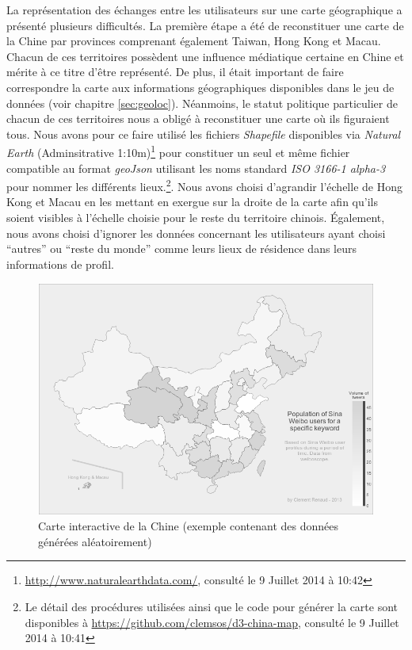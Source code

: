     La représentation des échanges entre les utilisateurs sur une carte géographique a présenté plusieurs difficultés. La première étape a été de reconstituer une carte de la Chine par provinces comprenant également Taiwan, Hong Kong et Macau. Chacun de ces territoires possèdent une influence médiatique certaine en Chine et mérite à ce titre d{\textquoteright}être représenté. De plus, il était important de faire correspondre la carte aux informations géographiques disponibles dans le jeu de données (voir chapitre \ref{sec:geoloc}). Néanmoins, le statut politique particulier de chacun de ces territoires nous a obligé à reconstituer une carte o\`u ils figuraient tous. Nous avons pour ce faire utilisé les fichiers \textit{Shapefile} disponibles via \textit{Natural Earth} (Adminsitrative 1:10m)\footnote{\url{http://www.naturalearthdata.com/}, consulté le 9 Juillet 2014 à 10:42} pour constituer un seul et même fichier compatible au format \textit{geoJson} utilisant les noms standard \textit{ISO 3166-1 alpha-3} pour nommer les différents lieux.\footnote{Le détail des procédures utilisées ainsi que le code pour générer la carte sont disponibles à \url{https://github.com/clemsos/d3-china-map}, consulté le 9 Juillet 2014 à 10:41}. Nous avons choisi d{\textquoteright}agrandir l{\textquoteright}échelle de Hong Kong et Macau en les mettant en exergue sur la droite de la carte afin qu{\textquoteright}ils soient visibles à l'échelle choisie pour le reste du territoire chinois. \'Egalement, nous avons choisi d'ignorer les données concernant les utilisateurs ayant choisi {\textquotedblleft}autres{\textquotedblright} ou {\textquotedblleft}reste du monde{\textquotedblright} comme leurs lieux de résidence dans leurs informations de profil.


    \begin{figure}
        \centering
        \includegraphics[scale=0.4]{figures/chap4/ui/ui-map.png}
        \caption{Carte interactive de la Chine (exemple contenant des données générées aléatoirement)}
        \label{fig:ui-map}
    \end{figure}

